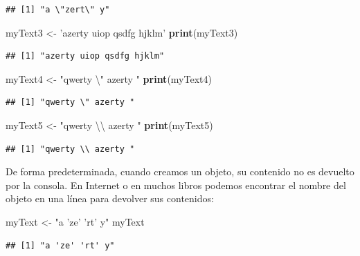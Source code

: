\documentclass[]{book}
\newenvironment{Shaded}{\begin{snugshade}}{\end{snugshade}}
\newcommand{\KeywordTok}[1]{\textcolor[rgb]{0.13,0.29,0.53}{\textbf{#1}}}
\newcommand{\CharTok}[1]{\textcolor[rgb]{0.31,0.60,0.02}{#1}}
\newcommand{\StringTok}[1]{\textcolor[rgb]{0.31,0.60,0.02}{#1}}
\newcommand{\NormalTok}[1]{#1}
\begin{document}
\begin{verbatim}
## [1] "a \"zert\" y"
\end{verbatim}

\begin{Shaded}
\begin{Highlighting}[]
\NormalTok{myText3 <-}\StringTok{ 'azerty uiop qsdfg hjklm'}
\KeywordTok{print}\NormalTok{(myText3)}
\end{Highlighting}
\end{Shaded}

\begin{verbatim}
## [1] "azerty uiop qsdfg hjklm"
\end{verbatim}

\begin{Shaded}
\begin{Highlighting}[]
\NormalTok{myText4 <-}\StringTok{ "qwerty }\CharTok{\textbackslash{}"}\StringTok{ azerty "}
\KeywordTok{print}\NormalTok{(myText4)}
\end{Highlighting}
\end{Shaded}

\begin{verbatim}
## [1] "qwerty \" azerty "
\end{verbatim}

\begin{Shaded}
\begin{Highlighting}[]
\NormalTok{myText5 <-}\StringTok{ "qwerty }\CharTok{\textbackslash{}\textbackslash{}}\StringTok{ azerty "}
\KeywordTok{print}\NormalTok{(myText5)}
\end{Highlighting}
\end{Shaded}

\begin{verbatim}
## [1] "qwerty \\ azerty "
\end{verbatim}

De forma predeterminada, cuando creamos un objeto, su contenido no es
devuelto por la consola. En Internet o en muchos libros podemos
encontrar el nombre del objeto en una línea para devolver sus
contenidos:

\begin{Shaded}
\begin{Highlighting}[]
\NormalTok{myText <-}\StringTok{ "a 'ze' 'rt' y"}
\NormalTok{myText}
\end{Highlighting}
\end{Shaded}

\begin{verbatim}
## [1] "a 'ze' 'rt' y"
\end{verbatim}
\end{document}

